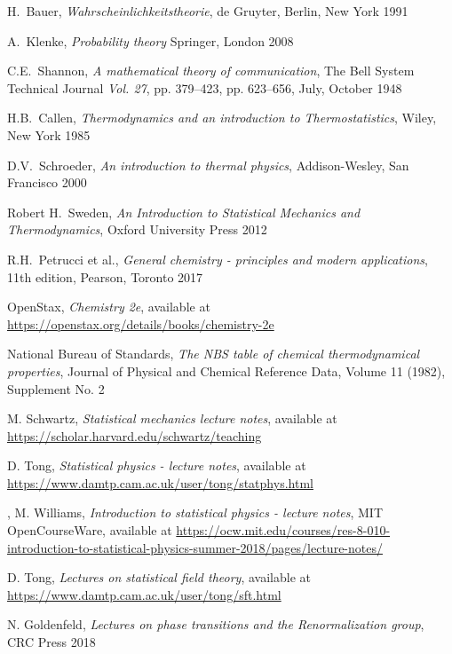 \documentclass[a4paper, draft]{article}
\theoremstyle{own}
\theoremstyle{remark}
\begin{document}
\begin{thebibliography}{9}
	
H.~Bauer,
{\em Wahrscheinlichkeitstheorie},
de Gruyter, Berlin, New York 1991
	
A.~Klenke,
{\em Probability theory}
Springer, London 2008


C.E.~Shannon,
{\em A mathematical theory of communication}, 
The Bell System Technical Journal {\em Vol. 27}, pp. 379--423, pp. 623--656, July, October 1948



H.B.~Callen,
{\em Thermodynamics and an introduction to Thermostatistics},
Wiley, New York 1985


D.V.~Schroeder,
{\em An introduction to thermal physics},
Addison-Wesley, San Francisco 2000

Robert H.~Sweden,
{\em An Introduction to Statistical Mechanics and Thermodynamics}, Oxford University Press 2012

R.H.~Petrucci et al., 
{\em General chemistry - principles and modern applications}, 11th edition, Pearson, Toronto 2017

OpenStax, {\em Chemistry 2e}, available at \url{https://openstax.org/details/books/chemistry-2e}

National Bureau of Standards, {\em The NBS table of chemical thermodynamical properties}, Journal of Physical and Chemical Reference Data, Volume 11 (1982), Supplement No. 2

M. Schwartz, {\em Statistical mechanics lecture notes}, available at \url{https://scholar.harvard.edu/schwartz/teaching}	

D. Tong, {\em Statistical physics - lecture notes}, available at \url{https://www.damtp.cam.ac.uk/user/tong/statphys.html}

,
M. Williams, {\em Introduction to statistical physics - lecture notes}, MIT OpenCourseWare, available at \url{https://ocw.mit.edu/courses/res-8-010-introduction-to-statistical-physics-summer-2018/pages/lecture-notes/}

D. Tong, {\em Lectures on statistical field theory}, available at \url{https://www.damtp.cam.ac.uk/user/tong/sft.html}

N. Goldenfeld, {\em Lectures on phase transitions and the Renormalization group}, CRC Press 2018

\end{thebibliography}
\end{document}
